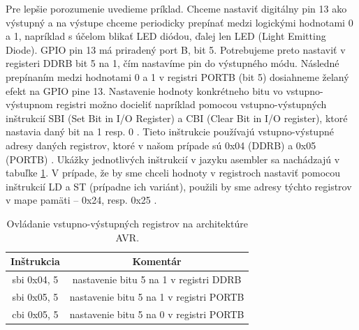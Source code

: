 Pre lepšie porozumenie uvedieme príklad. Chceme nastaviť digitálny pin 13 ako výstupný a na výstupe chceme periodicky prepínať medzi logickými hodnotami 0 a 1, napríklad s účelom blikať LED diódou, ďalej len LED (Light Emitting Diode). GPIO pin 13 má priradený port B, bit 5. Potrebujeme preto nastaviť v registeri DDRB bit 5 na 1, čím nastavíme pin do výstupného módu. Následné prepínaním medzi hodnotami 0 a 1 v registri PORTB (bit 5) dosiahneme želaný efekt na GPIO pine 13. Nastavenie hodnoty konkrétneho bitu vo vstupno-výstupnom registri možno docieliť napríklad pomocou vstupno-výstupných inštrukcií SBI (Set Bit in I/O Register) a CBI (Clear Bit in I/O register), ktoré nastavia daný bit na 1 resp. 0 \cite{avrInstruction}. Tieto inštrukcie používajú vstupno-výstupné adresy daných registrov, ktoré v našom prípade sú 0x04 (DDRB) a 0x05 (PORTB) \cite{atmegaData}. Ukážky jednotlivých inštrukcií v jazyku asembler sa nachádzajú v tabuľke \ref{tab:ovladanieVV}. V prípade, že by sme chceli hodnoty v registroch nastaviť pomocou inštrukcií LD a ST (prípadne ich variánt), použili by sme adresy týchto registrov v mape pamäti -- 0x24, resp. 0x25 \cite{atmegaData}.

\begin{table}
    \caption[Ovládanie vstupno-výstupných registrov na architektúre AVR]{Ovládanie vstupno-výstupných registrov na architektúre AVR.}
    \label{tab:ovladanieVV}
    \begin{center}
    \begin{tabular}{|c|c|}
        \hline 
        Inštrukcia & Komentár \\
        \hline
        sbi 0x04, 5 & nastavenie bitu 5 na 1 v registri DDRB \\
        \hline
        sbi 0x05, 5 & nastavenie bitu 5 na 1 v registri PORTB \\
        \hline
        cbi 0x05, 5 & nastavenie bitu 5 na 0 v registri PORTB \\
        \hline
    \end{tabular}
    \end{center}
\end{table}

